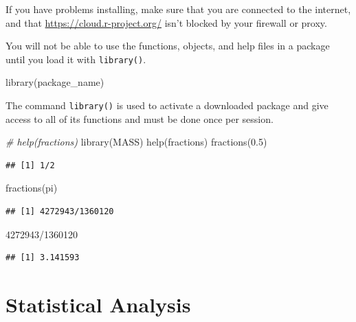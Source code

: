 \documentclass[
]{book}
\newenvironment{Shaded}{\begin{snugshade}}{\end{snugshade}}
\newcommand{\CommentTok}[1]{\textcolor[rgb]{0.56,0.35,0.01}{\textit{#1}}}
\newcommand{\DecValTok}[1]{\textcolor[rgb]{0.00,0.00,0.81}{#1}}
\newcommand{\FloatTok}[1]{\textcolor[rgb]{0.00,0.00,0.81}{#1}}
\newcommand{\FunctionTok}[1]{\textcolor[rgb]{0.00,0.00,0.00}{#1}}
\newcommand{\NormalTok}[1]{#1}
\newcommand{\SpecialCharTok}[1]{\textcolor[rgb]{0.00,0.00,0.00}{#1}}
\begin{document}
If you have problems installing, make sure that you are connected to the internet, and that \url{https://cloud.r-project.org/} isn't blocked by your firewall or proxy.

You will not be able to use the functions, objects, and help files in a package until you load it with \texttt{library()}.

\begin{Shaded}
\begin{Highlighting}[]
\FunctionTok{library}\NormalTok{(package\_name)}
\end{Highlighting}
\end{Shaded}

The command \texttt{library()} is used to activate a downloaded package and give access to all of its functions and must be done once per session.

\begin{Shaded}
\begin{Highlighting}[]
\CommentTok{\# help(fractions)}
\FunctionTok{library}\NormalTok{(MASS)}
\FunctionTok{help}\NormalTok{(fractions)}
\FunctionTok{fractions}\NormalTok{(}\FloatTok{0.5}\NormalTok{)}
\end{Highlighting}
\end{Shaded}

\begin{verbatim}
## [1] 1/2
\end{verbatim}

\begin{Shaded}
\begin{Highlighting}[]
\FunctionTok{fractions}\NormalTok{(pi)}
\end{Highlighting}
\end{Shaded}

\begin{verbatim}
## [1] 4272943/1360120
\end{verbatim}

\begin{Shaded}
\begin{Highlighting}[]
\DecValTok{4272943}\SpecialCharTok{/}\DecValTok{1360120}
\end{Highlighting}
\end{Shaded}

\begin{verbatim}
## [1] 3.141593
\end{verbatim}

\hypertarget{statistical-analysis}{%
\chapter{Statistical Analysis}\label{statistical-analysis}}
\end{document}

